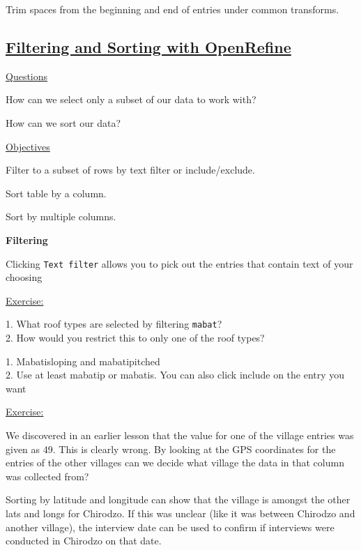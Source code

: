 \documentclass[12pt]{article}
\begin{document}
Trim spaces from the beginning and end of entries under common transforms.

\newpage
\subsection{\href{https://datacarpentry.org/openrefine-socialsci/03-filter-sort/index.html}{\textbf{Filtering and Sorting with OpenRefine}}}
\color{gray}
\underline{Questions}

How can we select only a subset of our data to work with?

How can we sort our data?

\underline{Objectives}

Filter to a subset of rows by text filter or include/exclude.

Sort table by a column.

Sort by multiple columns.

\color{black}

\vspace{1em}
\textbf{Filtering}

Clicking \texttt{Text filter} allows you to pick out the entries that contain text of your choosing

\begin{addmargin}[1cm]{0cm}
\color{gray}
\underline{Exercise:}

1. What roof types are selected by filtering \texttt{mabat}?
\\2. How would you restrict this to only one of the roof types?

\color{black}\vspace{0.5em}
1. Mabatisloping and mabatipitched
\\2. Use at least mabatip or mabatis. You can also click include on the entry you want

\color{gray}
\underline{Exercise:}

We discovered in an earlier lesson that the value for one of the village entries was given as 49. This is clearly wrong. By looking at the GPS coordinates for the entries of the other villages can we decide what village the data in that column was collected from?

\color{black}\vspace{0.5em}
Sorting by latitude and longitude can show that the village is amongst the other lats and longs for Chirodzo. If this was unclear (like it was between Chirodzo and another village), the interview date can be used to confirm if interviews were conducted in Chirodzo on that date.
\end{addmargin}
\end{document}
